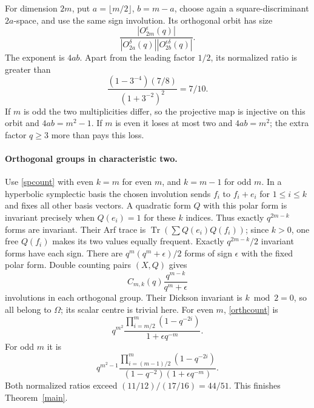 \documentclass[10pt]{article}
\newcommand{\Om}{\Omega}
\begin{document}
For dimension $2m$, put $a=\lfloor m/2\rfloor$, $b=m-a$, choose again
a square-discriminant $2a$-space, and use the same sign involution. Its
orthogonal orbit has size
\[
\frac{|O_{2m}^{\epsilon}(q)|}
{|O_{2a}^{\delta}(q)||O_{2b}^{\epsilon\delta}(q)|}.
\]
The exponent is $4ab$. Apart from the leading factor $1/2$, its normalized
ratio is greater than
\[
\frac{(1-3^{-4})(7/8)}{(1+3^{-2})^2}=7/10.
\]
If $m$ is odd the two multiplicities differ, so the projective map is
injective on this orbit and $4ab=m^2-1$. If $m$ is even it loses at most
two and $4ab=m^2$; the extra factor $q\ge3$ more than pays this loss.

\paragraph{Orthogonal groups in characteristic two.}
Use \eqref{spcount} with even $k=m$ for even $m$, and $k=m-1$ for odd $m$.
In a hyperbolic symplectic basis the chosen involution sends $f_i$ to
$f_i+e_i$ for $1\le i\le k$ and fixes all other basis vectors. A quadratic
form $Q$ with this polar form is invariant precisely when $Q(e_i)=1$
for these $k$ indices. Thus exactly $q^{2m-k}$ forms are invariant.
Their Arf trace is
$\operatorname{Tr}(\sum Q(e_i)Q(f_i))$; since $k>0$, one free $Q(f_i)$
makes its two values equally frequent. Exactly $q^{2m-k}/2$ invariant
forms have each sign. There are $q^m(q^m+\epsilon)/2$ forms of sign
$\epsilon$ with the fixed polar form. Double counting pairs $(X,Q)$ gives
\begin{equation}\label{orthcount}
C_{m,k}(q)\frac{q^{m-k}}{q^m+\epsilon}
\end{equation}
involutions in each orthogonal group. Their Dickson invariant is $k\bmod2=0$,
so all belong to $\Om$; its scalar centre is trivial here. For even $m$,
\eqref{orthcount} is
\[
q^{m^2}\frac{\prod_{i=m/2}^m(1-q^{-2i})}{1+\epsilon q^{-m}}.
\]
For odd $m$ it is
\[
q^{m^2-1}\frac{\prod_{i=(m-1)/2}^m(1-q^{-2i})}
{(1-q^{-2})(1+\epsilon q^{-m})}.
\]
Both normalized ratios exceed $(11/12)/(17/16)=44/51$. This finishes
Theorem~\ref{main}.
\end{document}
